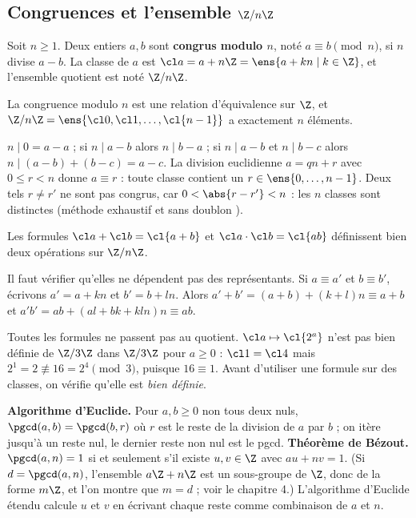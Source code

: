 \subsection{Congruences et l'ensemble $\Z/n\Z$}
\begin{definition}
Soit $n\ge1$. Deux entiers $a,b$ sont \textbf{congrus modulo $n$}, noté $a\equiv b \pmod n$, si $n$ divise $a-b$. La classe de $a$ est $\cl a=a+n\Z=\ens{a+kn\mid k\in\Z}$, et l'ensemble quotient est noté $\Z/n\Z$.
\end{definition}
\begin{proposition}\label{prop-congruence}
La congruence modulo $n$ est une relation d'équivalence sur $\Z$, et $\Z/n\Z=\ens{\cl0,\cl1,\dots,\cl{n-1}}$ a exactement $n$ éléments.
\end{proposition}
\begin{preuve}
$n\mid 0=a-a$ ; si $n\mid a-b$ alors $n\mid b-a$ ; si $n\mid a-b$ et $n\mid b-c$ alors $n\mid(a-b)+(b-c)=a-c$. La division euclidienne $a=qn+r$ avec $0\le r<n$ donne $a\equiv r$ : toute classe contient un $r\in\ens{0,\dots,n-1}$. Deux tels $r\neq r'$ ne sont pas congrus, car $0<\abs{r-r'}<n$ : les $n$ classes sont distinctes (méthode \og exhaustif et sans doublon \fg).
\end{preuve}
\begin{proposition}\label{prop-zn-operations}
Les formules $\cl a+\cl b=\cl{a+b}$ et $\cl a\cdot\cl b=\cl{ab}$ définissent bien deux opérations sur $\Z/n\Z$.
\end{proposition}
\begin{preuve}
Il faut vérifier qu'elles ne dépendent pas des représentants. Si $a\equiv a'$ et $b\equiv b'$, écrivons $a'=a+kn$ et $b'=b+ln$. Alors $a'+b'=(a+b)+(k+l)n\equiv a+b$ et $a'b'=ab+(al+bk+kln)n\equiv ab$.
\end{preuve}
\begin{attention}
Toutes les formules ne passent pas au quotient. $\cl a\mapsto\cl{2^a}$ n'est pas bien définie de $\Z/3\Z$ dans $\Z/3\Z$ pour $a\ge0$ : $\cl1=\cl4$ mais $2^1=2\not\equiv 16=2^4\pmod 3$, puisque $16\equiv1$. Avant d'utiliser une formule sur des classes, on vérifie qu'elle est \emph{bien définie}.
\end{attention}
\begin{remarque}
\textbf{Algorithme d'Euclide.} Pour $a,b\ge 0$ non tous deux nuls, $\pgcd(a,b)=\pgcd(b,r)$ où $r$ est le reste de la division de $a$ par $b$ ; on itère jusqu'à un reste nul, le dernier reste non nul est le pgcd.
\textbf{Théorème de Bézout.} $\pgcd(a,n)=1$ si et seulement s'il existe $u,v\in\Z$ avec $au+nv=1$. (Si $d=\pgcd(a,n)$, l'ensemble $a\Z+n\Z$ est un sous-groupe de $\Z$, donc de la forme $m\Z$, et l'on montre que $m=d$ ; voir le chapitre 4.) L'algorithme d'Euclide \og étendu \fg{} calcule $u$ et $v$ en écrivant chaque reste comme combinaison de $a$ et $n$.
\end{remarque}
